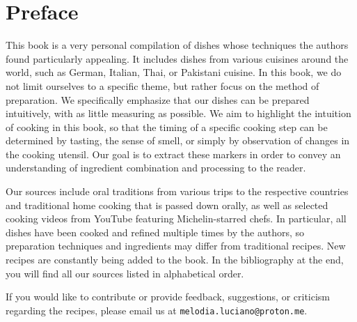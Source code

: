 \chapter*{Preface}
This book is a very personal compilation of dishes whose techniques the authors found particularly appealing. It includes dishes from various cuisines around the world, such as German, Italian, Thai, or Pakistani cuisine. In this book, we do not limit ourselves to a specific theme, but rather focus on the method of preparation. We specifically emphasize that our dishes can be prepared intuitively, with as little measuring as possible. We aim to highlight the intuition of cooking in this book, so that the timing of a specific cooking step can be determined by tasting, the sense of smell, or simply by observation of changes in the cooking utensil. Our goal is to extract these markers in order to convey an understanding of ingredient combination and processing to the reader.

Our sources include oral traditions from various trips to the respective countries and traditional home cooking that is passed down orally, as well as selected cooking videos from YouTube featuring Michelin-starred chefs. In particular, all dishes have been cooked and refined multiple times by the authors, so preparation techniques and ingredients may differ from traditional recipes. New recipes are constantly being added to the book. In the bibliography at the end, you will find all our sources listed in alphabetical order.

If you would like to contribute or provide feedback, suggestions, or criticism regarding the recipes, please email us at \texttt{melodia.luciano@proton.me}.